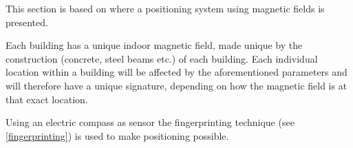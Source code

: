 This section is based on \citet{geomagnetism} where a positioning system using magnetic fields is presented.

Each building has a unique indoor magnetic field, made unique by the construction (concrete, steel beams etc.) of each building.
Each individual location within a building will be affected by the aforementioned parameters and will therefore have a unique signature, depending on how the magnetic field is at that exact location.

Using an electric compass as sensor the fingerprinting technique (see \cref{fingerprinting}) is used to make positioning possible.

